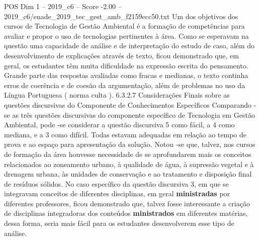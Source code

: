 \begin{textsample}{POS Dim 1 – 2019\_c6 – Score -2.00 – 2019\_c6/enade\_2019\_tec\_gest\_amb\_f2159ecc50.txt}
Um dos objetivos dos cursos de Tecnologia de Gestão Ambiental é a formação de competências para avaliar e propor o uso de tecnologias pertinentes à área.
Como se esperavam na questão uma capacidade de análise e de interpretação do estudo de caso, além do desenvolvimento de explicações através de texto, ficou demonstrado que, em geral, os estudantes têm muita dificuldade na expressão escrita do pensamento.
Grande parte das respostas avaliadas como fracas e medianas, o texto continha erros de coerência e de coesão da argumentação, além de problemas no uso da Língua Portuguesa ( norma culta ). 6.3.2.7 Considerações Finais sobre as questões discursivas do Componente de Conhecimentos Específicos Comparando -se as três questões discursivas do componente específico de Tecnologia em Gestão Ambiental, pode -se considerar a questão discursiva 5 como fácil, a 4 como mediana, e a 3 como difícil.
Todas estavam adequadas em relação ao tempo de prova e ao espaço para apresentação da solução.
Notou -se que, talvez, nos cursos de formação da área houvesse necessidade de se aprofundarem mais os conceitos relacionados ao zoneamento urbano, à qualidade de água, à supressão vegetal e à drenagem urbana, às unidades de conservação e ao tratamento e disposição final de resíduos sólidos.
No caso específico da questão discursiva 3, em que se integravam conceitos de diferentes disciplinas, em geral \textbf{ministradas} por diferentes professores, ficou demonstrado que, talvez fosse interessante a criação de disciplinas integradoras dos conteúdos \textbf{ministrados} em diferentes matérias, dessa forma, seria mais fácil para os estudantes desenvolverem esse tipo de análise.

\end{textsample}

